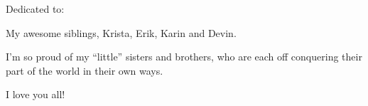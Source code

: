 %
%
\thispagestyle{empty}
{}

\vspace*{3cm}

%

\begin{center}
    Dedicated to:

\par
    My awesome siblings, Krista, Erik, Karin and Devin.

\par
    I'm so proud of my ``little'' sisters and brothers, who are each off conquering their part of the world in their own ways.
\par
    I love you all!
\end{center}
